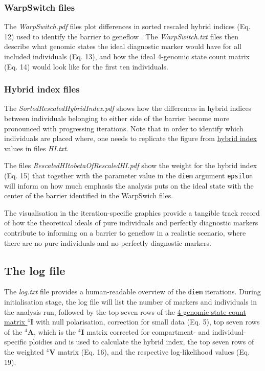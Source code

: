 \documentclass[
]{book}
\begin{document}
\subsubsection{WarpSwitch files}\label{warpswitch-files}

The \emph{WarpSwitch.pdf} files plot differences in sorted rescaled hybrid indices (Eq. 12) used to identify the barrier to geneflow \citep{Baird2023}. The \emph{WarpSwitch.txt} files then describe what genomic states the ideal diagnostic marker would have for all included individuals (Eq. 13), and how the ideal 4-genomic state count matrix (Eq. 14) would look like for the first ten individuals.

\subsubsection{Hybrid index files}\label{hybrid-index-files}

The \emph{SortedRescaledHybridIndex.pdf} shows how the differences in hybrid indices between individuals belonging to either side of the barrier become more pronounced with progressing iterations. Note that in order to identify which individuals are placed where, one needs to replicate the figure from \hyperref[HI]{hybrid index} values in files \emph{HI.txt}.

The files \emph{RescaledHItobetaOfRescaledHI.pdf} show the weight for the hybrid index (Eq. 15) that together with the parameter value in the \texttt{diem} argument \texttt{epsilon} will inform on how much emphasis the analysis puts on the ideal state with the center of the barrier identified in the WarpSwich files.

The visualisation in the iteration-specific graphics provide a tangible track record of how the theoretical ideals of pure individuals and perfectly diagnostic markers contribute to informing on a barrier to geneflow in a realistic scenario, where there are no pure individuals and no perfectly diagnostic markers.

\subsection{The log file}\label{the-log-file}

The \emph{log.txt} file provides a human-readable overview of the \texttt{diem} iterations. During initialisation stage, the log file will list the number of markers and individuals in the analysis run, followed by the top seven rows of the \hyperref[I4]{4-genomic state count matrix \({}^4\mathbf{I}\)} with null polarisation, correction for small data (Eq. 5), top seven rows of the \({}^4\mathbf{A}\), which is the \({}^4\mathbf{I}\) matrix corrected for compartment- and individual-specific ploidies and is used to calculate the hybrid index, the top seven rows of the weighted \({}^4\mathbf{V}\) matrix (Eq. 16), and the respective log-likelihood values (Eq. 19).
\end{document}
